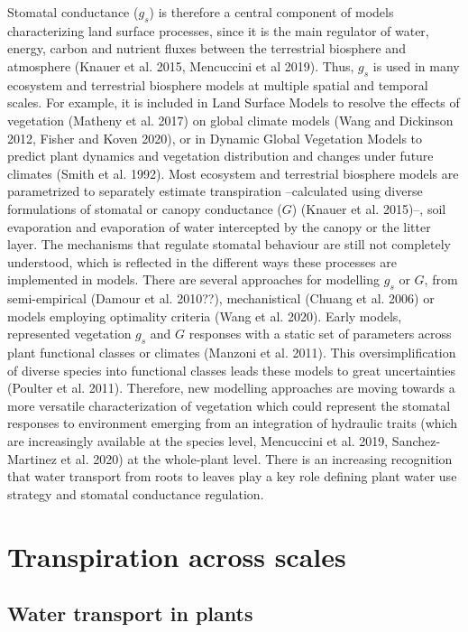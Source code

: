 \documentclass[11pt,twoside]{reedthesis}
\begin{document}
Stomatal conductance (\(g_s\)) is therefore a central component of
models characterizing land surface processes, since it is the main
regulator of water, energy, carbon and nutrient fluxes between the
terrestrial biosphere and atmosphere (Knauer et al. 2015, Mencuccini et
al 2019). Thus, \(g_s\) is used in many ecosystem and terrestrial
biosphere models at multiple spatial and temporal scales. For example,
it is included in Land Surface Models to resolve the effects of
vegetation (Matheny et al. 2017) on global climate models (Wang and
Dickinson 2012, Fisher and Koven 2020), or in Dynamic Global Vegetation
Models to predict plant dynamics and vegetation distribution and changes
under future climates (Smith et al. 1992). Most ecosystem and
terrestrial biosphere models are parametrized to separately estimate
transpiration --calculated using diverse formulations of stomatal or
canopy conductance (\(G\)) (Knauer et al. 2015)--, soil evaporation and
evaporation of water intercepted by the canopy or the litter layer. The
mechanisms that regulate stomatal behaviour are still not completely
understood, which is reflected in the different ways these processes are
implemented in models. There are several approaches for modelling
\(g_s\) or \(G\), from semi-empirical (Damour et al. 2010??),
mechanistical (Chuang et al. 2006) or models employing optimality
criteria (Wang et al. 2020). Early models, represented vegetation
\(g_s\) and \(G\) responses with a static set of parameters across plant
functional classes or climates (Manzoni et al. 2011). This
oversimplification of diverse species into functional classes leads
these models to great uncertainties (Poulter et al. 2011). Therefore,
new modelling approaches are moving towards a more versatile
characterization of vegetation which could represent the stomatal
responses to environment emerging from an integration of hydraulic
traits (which are increasingly available at the species level,
Mencuccini et al. 2019, Sanchez-Martinez et al. 2020) at the whole-plant
level. There is an increasing recognition that water transport from
roots to leaves play a key role defining plant water use strategy and
stomatal conductance regulation.\par

\section{Transpiration across scales}\label{transpiration-across-scales}

\subsection{Water transport in plants}\label{water-transport-in-plants}
\end{document}
